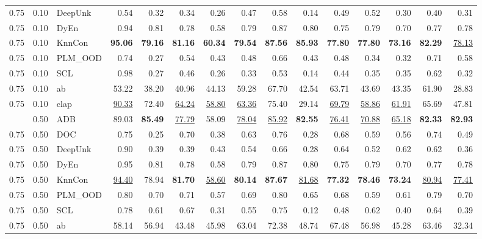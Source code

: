 \begin{table}[t]
{\begin{tabular}{lllrrrrrrrrrrrr}
0.75 & 0.10 & DeepUnk & 0.54 & 0.32 & 0.34 & 0.26 & 0.47 & 0.58 & 0.14 & 0.49 & 0.52 & 0.30 & 0.40 & 0.31 \\
0.75 & 0.10 & DyEn & 0.94 & 0.81 & 0.78 & 0.58 & 0.79 & 0.87 & 0.80 & 0.75 & 0.79 & 0.70 & 0.77 & 0.78 \\
0.75 & 0.10 & KnnCon & \textbf{95.06} & \textbf{79.16} & \textbf{81.16} & \textbf{60.34} & \textbf{79.54} & \textbf{87.56} & \textbf{85.93} & \textbf{77.80} & \textbf{77.80} & \textbf{73.16} & \textbf{82.29} & \underline{78.13} \\
0.75 & 0.10 & PLM_OOD & 0.74 & 0.27 & 0.54 & 0.43 & 0.48 & 0.66 & 0.43 & 0.48 & 0.34 & 0.32 & 0.71 & 0.58 \\
0.75 & 0.10 & SCL & 0.98 & 0.27 & 0.46 & 0.26 & 0.33 & 0.53 & 0.14 & 0.44 & 0.35 & 0.35 & 0.62 & 0.32 \\
0.75 & 0.10 & ab & 53.22 & 38.20 & 40.96 & 44.13 & 59.28 & 67.70 & 42.54 & 63.71 & 43.69 & 43.35 & 61.90 & 28.83 \\
0.75 & 0.10 & clap & \underline{90.33} & 72.40 & \underline{64.24} & \underline{58.80} & \underline{63.36} & 75.40 & 29.14 & \underline{69.79} & \underline{58.86} & \underline{61.91} & 65.69 & 47.81 \\
\addlinespace
0.75 & 0.50 & ADB & 89.03 & \textbf{85.49} & \underline{77.79} & 58.09 & \underline{78.04} & \underline{85.92} & \textbf{82.55} & \underline{76.41} & \underline{70.88} & \underline{65.18} & \textbf{82.33} & \textbf{82.93} \\
0.75 & 0.50 & DOC & 0.75 & 0.25 & 0.70 & 0.38 & 0.63 & 0.76 & 0.28 & 0.68 & 0.59 & 0.56 & 0.74 & 0.49 \\
0.75 & 0.50 & DeepUnk & 0.90 & 0.39 & 0.39 & 0.43 & 0.54 & 0.66 & 0.28 & 0.64 & 0.52 & 0.62 & 0.62 & 0.36 \\
0.75 & 0.50 & DyEn & 0.95 & 0.81 & 0.78 & 0.58 & 0.79 & 0.87 & 0.80 & 0.75 & 0.79 & 0.70 & 0.77 & 0.78 \\
0.75 & 0.50 & KnnCon & \underline{94.40} & 78.94 & \textbf{81.70} & \underline{58.60} & \textbf{80.14} & \textbf{87.67} & \underline{81.68} & \textbf{77.32} & \textbf{78.46} & \textbf{73.24} & \underline{80.94} & \underline{77.41} \\
0.75 & 0.50 & PLM_OOD & 0.80 & 0.70 & 0.71 & 0.57 & 0.69 & 0.80 & 0.65 & 0.68 & 0.59 & 0.61 & 0.79 & 0.70 \\
0.75 & 0.50 & SCL & 0.78 & 0.61 & 0.67 & 0.31 & 0.55 & 0.75 & 0.12 & 0.48 & 0.62 & 0.40 & 0.64 & 0.39 \\
0.75 & 0.50 & ab & 58.14 & 56.94 & 43.48 & 45.98 & 63.04 & 72.38 & 48.74 & 67.48 & 56.98 & 45.28 & 63.46 & 32.34 \\

\end{tabular}}
\end{table}
